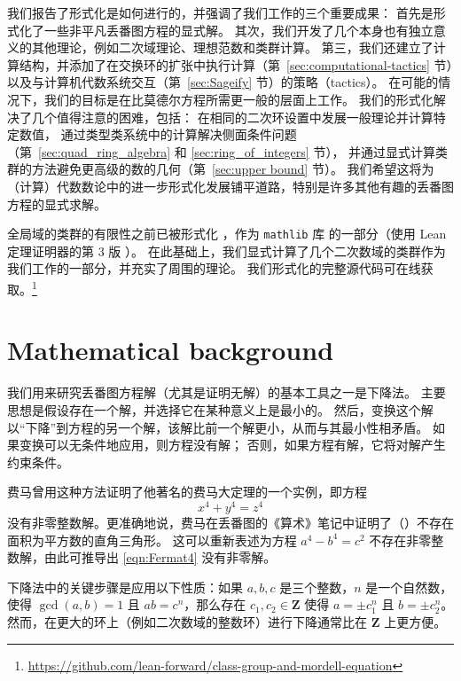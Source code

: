 \documentclass[sigplan,10pt,nonacm,
screen]{acmart} \settopmatter{printfolios=true,printccs=false,printacmref=false}
\newcommand{\mathlib}{\lstinline{mathlib}\xspace}
\newcommand{\ZZ}{\mathbf{Z}}
\begin{document}
我们报告了形式化是如何进行的，并强调了我们工作的三个重要成果：
首先是形式化了一些非平凡丢番图方程的显式解。
其次，我们开发了几个本身也有独立意义的其他理论，例如二次域理论、理想范数和类群计算。
第三，我们还建立了计算结构，并添加了在交换环的扩张中执行计算（第~\ref{sec:computational-tactics} 节）以及与计算机代数系统交互（第~\ref{sec:Sageify} 节）的策略（tactics）。
在可能的情况下，我们的目标是在比莫德尔方程所需更一般的层面上工作。
我们的形式化解决了几个值得注意的困难，包括：
在相同的二次环设置中发展一般理论并计算特定数值，
通过类型类系统中的计算解决侧面条件问题（第~\ref{sec:quad_ring_algebra} 和 \ref{sec:ring_of_integers} 节），
并通过显式计算类群的方法避免更高级的数的几何（第~\ref{sec:upper bound} 节）。
我们希望这将为（计算）代数数论中的进一步形式化发展铺平道路，特别是许多其他有趣的丢番图方程的显式求解。

全局域的类群的有限性之前已被形式化 \cite{baanen_formalization_2021}，作为 \mathlib 库 \cite{mathlib} 的一部分（使用 Lean 定理证明器的第 3 版 \cite{lean-prover}）。
在此基础上，我们显式计算了几个二次数域的类群作为我们工作的一部分，并充实了周围的理论。
我们形式化的完整源代码可在线获取。\footnote{\url{https://github.com/lean-forward/class-group-and-mordell-equation}}

\section{Mathematical background}\label{sec:Background}

我们用来研究丢番图方程解（尤其是证明无解）的基本工具之一是下降法。
主要思想是假设存在一个解，并选择它在某种意义上是最小的。
然后，变换这个解以“下降”到方程的另一个解，该解比前一个解更小，从而与其最小性相矛盾。
如果变换可以无条件地应用，则方程没有解；
否则，如果方程有解，它将对解产生约束条件。

费马曾用这种方法证明了他著名的费马大定理的一个实例，即方程
\begin{equation}\label{eqn:Fermat4}
 x^4+y^4=z^4
 \end{equation}
没有非零整数解。更准确地说，费马在丢番图的《算术》笔记中证明了（\cite[Section 1.6]{edwards-fermat}）不存在面积为平方数的直角三角形。
这可以重新表述为方程 $ a^4-b^4=c^2 $ 不存在非零整数解，由此可推导出 \eqref{eqn:Fermat4} 没有非零解。

下降法中的关键步骤是应用以下性质：如果 $a,b,c$ 是三个整数，$n$ 是一个自然数，使得 $\gcd(a,b)=1$ 且 $ab=c^n$，那么存在 $c_1,c_2 \in \ZZ$ 使得 $a=\pm c_1^n$ 且 $b=\pm c_2^n$。然而，在更大的环上（例如二次数域的整数环）进行下降通常比在 $\ZZ$ 上更方便。
\end{document}

